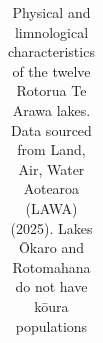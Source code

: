 \documentclass[
  12pt,
  a4paper,
  oneside]{scrbook}
\begin{document}
{

\begin{longtable}[]{@{}
  >{\raggedright\arraybackslash}p{}
  >{\raggedleft\arraybackslash}p{}
  >{\raggedleft\arraybackslash}p{}
  >{\raggedleft\arraybackslash}p{}
  >{\raggedleft\arraybackslash}p{}
  >{\raggedleft\arraybackslash}p{}
  >{\raggedleft\arraybackslash}p{}
  >{\raggedright\arraybackslash}p{}
  >{\raggedright\arraybackslash}p{}@{}}

\caption{\label{tbl-bop-lake-overview}Physical and limnological
characteristics of the twelve Rotorua Te Arawa lakes. Data sourced from
Land, Air, Water Aotearoa (LAWA) (2025). Lakes Ōkaro and Rotomahana do
not have kōura populations}

\tabularnewline


\end{longtable}}
\end{document}
